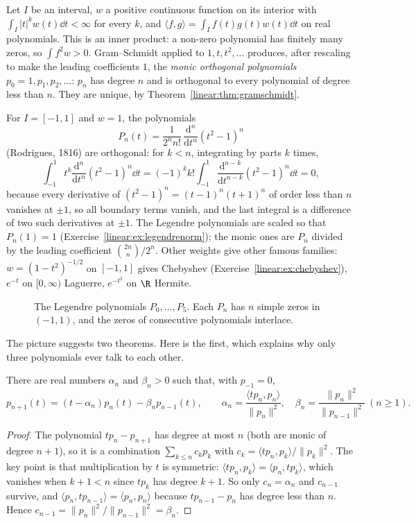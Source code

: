 Let $I$ be an interval, $w$ a positive continuous function on its interior with $\int_I|t|^kw(t)\dd t<\infty$ for every
$k$, and $\langle f,g\rangle=\int_If(t)g(t)w(t)\dd t$ on real polynomials. This is an inner product: a non-zero
polynomial has finitely many zeros, so $\int f^2w>0$. Gram--Schmidt applied to $1,t,t^2,\dots$ produces, after rescaling
to make the leading coefficients $1$, the \emph{monic orthogonal polynomials} $p_0=1,p_1,p_2,\dots$: $p_n$ has degree $n$
and is orthogonal to every polynomial of degree less than $n$. They are unique, by Theorem~\ref{linear:thm:gramschmidt}.

\begin{example}\label{linear:exa:legendre}
For $I=[-1,1]$ and $w=1$, the polynomials
\[
P_n(t)=\frac1{2^nn!}\,\frac{\mathrm d^n}{\mathrm dt^n}(t^2-1)^n
\]
(Rodrigues, 1816) are orthogonal: for $k<n$, integrating by parts $k$ times,
\[
\int_{-1}^1t^k\frac{\mathrm d^n}{\mathrm dt^n}(t^2-1)^n\dd t=(-1)^kk!\int_{-1}^1\frac{\mathrm d^{n-k}}{\mathrm dt^{n-k}}(t^2-1)^n\dd t=0,
\]
because every derivative of $(t^2-1)^n=(t-1)^n(t+1)^n$ of order less than $n$ vanishes at $\pm1$, so all boundary terms
vanish, and the last integral is a difference of two such derivatives at $\pm1$. The Legendre polynomials are scaled so
that $P_n(1)=1$ (Exercise~\ref{linear:ex:legendrenorm}); the monic ones are $P_n$ divided by the leading coefficient
$\binom{2n}n/2^n$. Other weights give other famous families: $w=(1-t^2)^{-1/2}$ on $[-1,1]$ gives Chebyshev
(Exercise~\ref{linear:ex:chebyshev}), $e^{-t}$ on $[0,\infty)$ Laguerre, $e^{-t^2}$ on $\R$ Hermite.
\end{example}

\begin{figure}[ht]
\centering
{}
\caption{The Legendre polynomials $P_0,\dots,P_5$. Each $P_n$ has $n$ simple zeros in $(-1,1)$, and the zeros of
consecutive polynomials interlace.}
\label{linear:fig:legendre}
\end{figure}

The picture suggests two theorems. Here is the first, which explains why only three polynomials ever talk to each other.

\begin{theorem}\label{linear:thm:recurrence}
There are real numbers $\alpha_n$ and $\beta_n>0$ such that, with $p_{-1}=0$,
\[
p_{n+1}(t)=(t-\alpha_n)p_n(t)-\beta_np_{n-1}(t),\qquad \alpha_n=\frac{\langle tp_n,p_n\rangle}{\|p_n\|^2},\quad
\beta_n=\frac{\|p_n\|^2}{\|p_{n-1}\|^2}\ (n\ge1).
\]
\end{theorem}
\begin{proof}
The polynomial $tp_n-p_{n+1}$ has degree at most $n$ (both are monic of degree $n+1$), so it is a combination
$\sum_{k\le n}c_kp_k$ with $c_k=\langle tp_n,p_k\rangle/\|p_k\|^2$. The key point is that multiplication by $t$ is
symmetric: $\langle tp_n,p_k\rangle=\langle p_n,tp_k\rangle$, which vanishes when $k+1<n$ since $tp_k$ has degree $k+1$.
So only $c_n=\alpha_n$ and $c_{n-1}$ survive, and $\langle p_n,tp_{n-1}\rangle=\langle p_n,p_n\rangle$ because
$tp_{n-1}-p_n$ has degree less than $n$. Hence $c_{n-1}=\|p_n\|^2/\|p_{n-1}\|^2=\beta_n$.
\end{proof}

